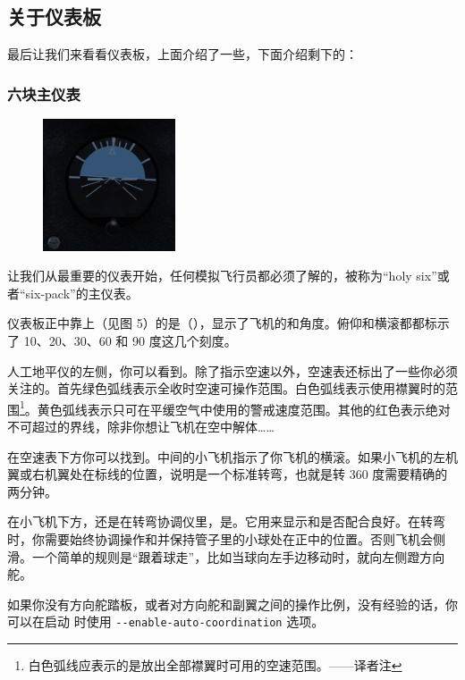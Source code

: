 \begin{itemize}
\subsection{关于仪表板}

最后让我们来看看仪表板，上面介绍了一些，下面介绍剩下的：

\subsubsection{六块主仪表}

\begin{figure}
  \includegraphics[width=0.35\textwidth]{img/basic_tutorial/attitude-indicator}
\end{figure}

让我们从最重要的仪表开始，任何模拟飞行员都必须了解的，被称为“holy six”或者“six-pack”的主仪表。

仪表板正中靠上（见图 5）的是（），显示了飞机的和角度。俯仰和横滚都都标示了 10、20、30、60 和 90 度这几个刻度。

人工地平仪的左侧，你可以看到。除了指示空速以外，空速表还标出了一些你必须关注的。首先绿色弧线表示全收时空速可操作范围。白色弧线表示使用襟翼时的范围\footnote{白色弧线应表示的是放出全部襟翼时可用的空速范围。——译者注}。黄色弧线表示只可在平缓空气中使用的警戒速度范围。其他的红色表示绝对不可超过的界线，除非你想让飞机在空中解体……

在空速表下方你可以找到。中间的小飞机指示了你飞机的横滚。如果小飞机的左机翼或右机翼处在标线的位置，说明是一个标准转弯，也就是转 360 度需要精确的两分钟。

在小飞机下方，还是在转弯协调仪里，是。它用来显示和是否配合良好。在转弯时，你需要始终协调操作和并保持管子里的小球处在正中的位置。否则飞机会侧滑。一个简单的规则是“跟着球走”，比如当球向左手边移动时，就向左侧蹬方向舵。
\medskip

如果你没有方向舵踏板，或者对方向舵和副翼之间的操作比例，没有经验的话，你可以在启动 \FlightGear{} 时使用 \texttt{-$ $-enable-auto-coordination} 选项。


\end{itemize}
